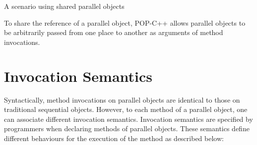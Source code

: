 {A scenario using shared parallel objects}

To share the reference of a parallel object, POP-C++ allows parallel objects
to be arbitrarily passed from one place to another as arguments of method
invocations.




\section{Invocation Semantics}\label{sec:inv:sem}

Syntactically, method invocations on parallel objects are identical to those
on traditional sequential objects. However, to each method of a parallel
object, one can associate different invocation semantics. Invocation
semantics are specified by programmers when declaring methods of
parallel objects. These semantics define different behaviours for the
execution of the method as described below:


